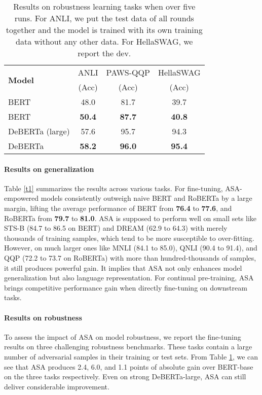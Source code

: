 \documentclass[letterpaper]{article} \usepackage{aaai23}  \usepackage{times}  \usepackage{helvet}  \usepackage{courier}  \usepackage[hyphens]{url}  \usepackage{graphicx} \urlstyle{rm} \def\UrlFont{\rm}  \usepackage{natbib}  \usepackage{caption} \frenchspacing  \setlength{\pdfpagewidth}{8.5in}  \setlength{\pdfpageheight}{11in}  \usepackage{algorithm}
\begin{document}
\begin{table}
\centering
\small
\begin{tabular}{@{}lccc@{}}
\toprule
\multirow{2}{*}{\textbf{Model}} & ANLI                          & PAWS-QQP                       & HellaSWAG               \\
                                & (Acc)                         & (Acc)                          & (Acc)                   \\ \midrule
BERT                            & 48.0               & 81.7               & 39.7          \\
BERT                    & \textbf{50.4} & \textbf{87.7} & \textbf{40.8} \\ \midrule
DeBERTa (large)                 & 57.6               & 95.7                & 94.3              \\
DeBERTa                 & \textbf{58.2}      & \textbf{96.0}       & \textbf{95.4}      \\ \bottomrule
\end{tabular}
\caption{Results on robustness learning tasks when  over five runs. For ANLI, we put the test data of all rounds together and the model is trained with its own training data without any other data. For HellaSWAG, we report the dev.}
\label{t2}
\end{table}

\paragraph{Results on generalization} Table \ref{t1} summarizes the results across various tasks. For fine-tuning, ASA-empowered models consistently outweigh naive BERT and RoBERTa by a large margin, lifting the average performance of BERT from \textbf{76.4} to \textbf{77.6}, and RoBERTa from \textbf{79.7} to \textbf{81.0}. ASA is supposed to perform well on small sets like STS-B (84.7 to 86.5 on BERT) and DREAM (62.9 to 64.3) with merely thousands of training samples, which tend to be more susceptible to over-fitting. However, on much larger ones like MNLI (84.1 to 85.0), QNLI (90.4 to 91.4), and QQP (72.2 to 73.7 on RoBERTa) with more than hundred-thousands of samples, it still produces powerful gain. It implies that ASA not only enhances model generalization but also language representation. For continual pre-training, ASA brings competitive performance gain when directly fine-tuning on downstream tasks.

\paragraph{Results on robustness} To assess the impact of ASA on model robustness, we report the fine-tuning results on three challenging robustness benchmarks. These tasks contain a large number of adversarial samples in their training or test sets. From Table \ref{t2}, we can see that ASA produces 2.4, 6.0, and 1.1 points of absolute gain over BERT-base on the three tasks respectively. Even on strong DeBERTa-large, ASA can still deliver considerable improvement.
\end{document}
